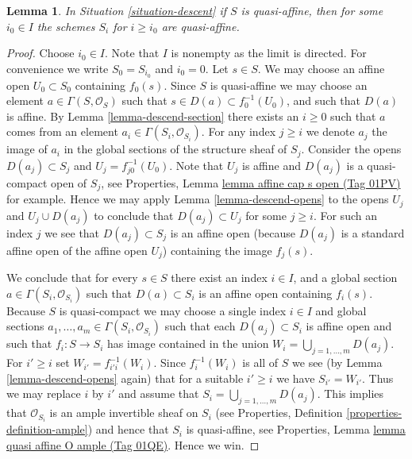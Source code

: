 \documentclass{amsart}
\theoremstyle{plain}
\newtheorem{lemma}[subsection]{Lemma}
\theoremstyle{definition}
\theoremstyle{remark}
\numberwithin{equation}{subsection}
\begin{document}
\begin{lemma}
\label{lemma-limit-quasi-affine}
In Situation \ref{situation-descent} if $S$ is quasi-affine, then
for some $i_0 \in I$ the schemes $S_i$ for $i \geq i_0$ are quasi-affine.
\end{lemma}

\begin{proof}
Choose $i_0 \in I$. Note that $I$ is nonempty as the limit is directed.
For convenience we write $S_0 = S_{i_0}$ and $i_0 = 0$.
Let $s \in S$. We may choose an affine open
$U_0 \subset S_0$ containing $f_0(s)$. Since $S$ is quasi-affine
we may choose an element $a \in \Gamma(S, \mathcal{O}_S)$ such
that $s \in D(a) \subset f_0^{-1}(U_0)$, and such that
$D(a)$ is affine. By Lemma \ref{lemma-descend-section}
there exists an $i \geq 0$ such that $a$
comes from an element $a_i \in \Gamma(S_i, \mathcal{O}_{S_i})$.
For any index $j \geq i$ we denote $a_j$
the image of $a_i$ in the global sections of the
structure sheaf of $S_j$.
Consider the opens $D(a_j) \subset S_j$
and $U_j = f_{j0}^{-1}(U_0)$. Note that
$U_j$ is affine and $D(a_j)$ is a quasi-compact open of $S_j$,
see Properties, Lemma \href{https://stacks.math.columbia.edu/tag/01PV}{lemma affine cap s open (Tag 01PV)}
for example. Hence we may apply Lemma \ref{lemma-descend-opens} to the opens
$U_j$ and $U_j \cup D(a_j)$ to conclude that
$D(a_j) \subset U_j$ for some  $j \geq i$.
For such an index $j$ we see that $D(a_j) \subset S_j$ is an affine open
(because $D(a_j)$ is a standard affine open of the affine open $U_j$)
containing the image $f_j(s)$.

\medskip\noindent
We conclude that for every $s \in S$ there exist
an index $i \in I$, and a global section
$a \in \Gamma(S_i, \mathcal{O}_{S_i})$
such that $D(a) \subset S_i$ is an affine open
containing $f_i(s)$. Because $S$ is quasi-compact we
may choose a single index $i \in I$ and global sections
$a_1, \ldots, a_m \in \Gamma(S_i, \mathcal{O}_{S_i})$
such that each $D(a_j) \subset S_i$ is affine open
and such that $f_i : S \to S_i$ has image contained
in the union $W_i = \bigcup_{j = 1, \ldots, m} D(a_j)$.
For $i' \geq i$ set $W_{i'} = f_{i'i}^{-1}(W_i)$.
Since $f_i^{-1}(W_i)$ is all of $S$ we see
(by Lemma \ref{lemma-descend-opens} again)
that for a suitable $i' \geq i$ we
have $S_{i'} = W_{i'}$. Thus we may replace $i$ by
$i'$ and assume that $S_i = \bigcup_{j = 1, \ldots, m} D(a_j)$.
This implies that $\mathcal{O}_{S_i}$ is an ample invertible
sheaf on $S_i$ (see Properties, Definition \ref{properties-definition-ample})
and hence that $S_i$ is quasi-affine, see
Properties, Lemma \href{https://stacks.math.columbia.edu/tag/01QE}{lemma quasi affine O ample (Tag 01QE)}.
Hence we win.
\end{proof}
\end{document}
